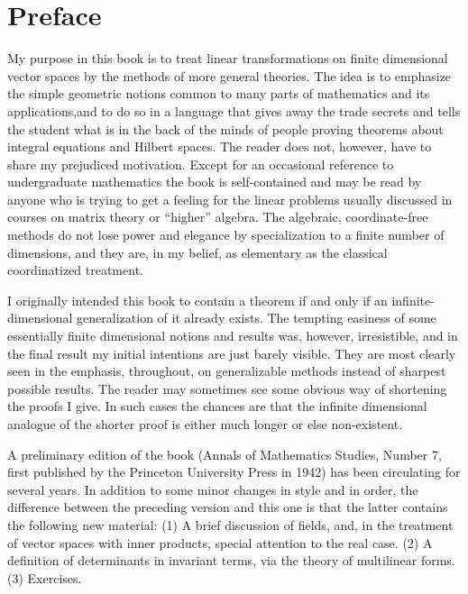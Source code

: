 \chapter{Preface}

My purpose in this book is to treat linear transformations on finite dimensional
vector spaces by the methods of more general theories. The idea is to emphasize
the simple geometric notions common to many parts of mathematics and its
applications,and to do so in a language that gives away the trade secrets and
tells the student what is in the back of the minds of people proving theorems
about integral equations and Hilbert spaces. The reader does not, however, have
to share my prejudiced motivation. Except for an occasional reference to
undergraduate mathematics the book is self-contained and may be read by anyone
who is trying to get a feeling for the linear problems usually discussed in
courses on matrix theory or ``higher'' algebra. The algebraic, coordinate-free
methods do not lose power and elegance by specialization to a finite number of
dimensions, and they are, in my belief, as elementary as the classical
coordinatized treatment.

I originally intended this book to contain a theorem if and only if an
infinite-dimensional generalization of it already exists. The tempting easiness
of some essentially finite dimensional notions and results was, however,
irresistible, and in the final result my initial intentions are just barely
visible. They are most clearly seen in the emphasis, throughout, on
generalizable methods instead of sharpest possible results. The reader may
sometimes see some obvious way of shortening the proofs I give. In such cases
the chances are that the infinite dimensional analogue of the shorter proof is
either much longer or else non-existent.

A preliminary edition of the book (Annals of Mathematics Studies, Number 7,
first published by the Princeton University Press in 1942) has been circulating
for several years. In addition to some minor changes in style and in order, the
difference between the preceding version and this one is that the latter
contains the following new material: (1) A brief discussion of fields, and, in
the treatment of vector spaces with inner products, special attention to the
real case. (2) A definition of determinants in invariant terms, via the theory
of multilinear forms. (3) Exercises.

